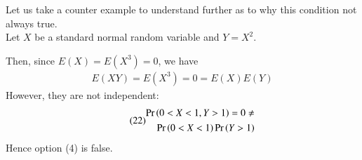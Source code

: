 \documentclass[journal,12pt,twocolumn]{IEEEtran}
\begin{document}
\begin{enumerate}
Let us take a counter example to understand further as to why this condition not always true.\\
Let $X$ be a standard normal random variable and $Y = X^2$.

Then, since $E(X) = E(X^3) = 0$, we have 
\begin{align}\tag{21}
    E(XY) = E(X^3) = 0 = E(X)E(Y)
\end{align}
However, they are not independent:
\begin{align}\tag{22}
    \begin{split}
        \Pr\left(0<X<1,Y>1\right) = 0 \neq\\
        \Pr\left(0<X<1\right)\Pr\left(Y>1\right)
    \end{split}
\end{align}
Hence option (4) is false.
\end{enumerate}
\end{document}
